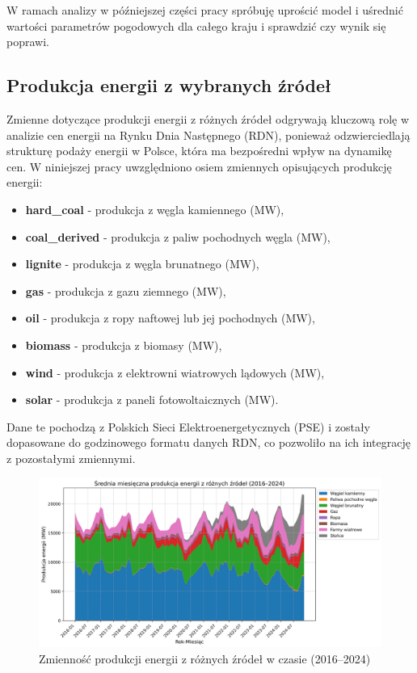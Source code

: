W ramach analizy w późniejszej części pracy spróbuję uprościć model i uśrednić wartości parametrów pogodowych dla całego kraju i sprawdzić czy wynik się poprawi. 

\subsection{Produkcja energii z wybranych źródeł}
Zmienne dotyczące produkcji energii z różnych źródeł odgrywają kluczową rolę w analizie cen energii na Rynku Dnia Następnego (RDN), ponieważ odzwierciedlają strukturę podaży energii w Polsce, która ma bezpośredni wpływ na dynamikę cen. W niniejszej pracy uwzględniono osiem zmiennych opisujących produkcję energii: 
\begin{itemize}
    \item \textbf{hard\_coal} - produkcja z węgla kamiennego (MW),
    \item \textbf{coal\_derived} - produkcja z paliw pochodnych węgla (MW),
    \item \textbf{lignite} - produkcja z węgla brunatnego (MW),
    \item \textbf{gas} - produkcja z gazu ziemnego (MW),
    \item \textbf{oil} - produkcja z ropy naftowej lub jej pochodnych (MW),
    \item \textbf{biomass} - produkcja z biomasy (MW),
    \item \textbf{wind} - produkcja z elektrowni wiatrowych lądowych (MW),
    \item \textbf{solar} - produkcja z paneli fotowoltaicznych (MW).
\end{itemize}

Dane te pochodzą z Polskich Sieci Elektroenergetycznych (PSE) i zostały dopasowane do godzinowego formatu danych RDN, co pozwoliło na ich integrację z pozostałymi zmiennymi. 
\begin{figure}[H]
    \centering
    \includegraphics[width=1.0\textwidth]{../plots/energy/energy_production_time_series_full.png}
    \caption{Zmienność produkcji energii z różnych źródeł w czasie (2016–2024)}
    \label{fig:energy-production-time-series-full}
\end{figure}

